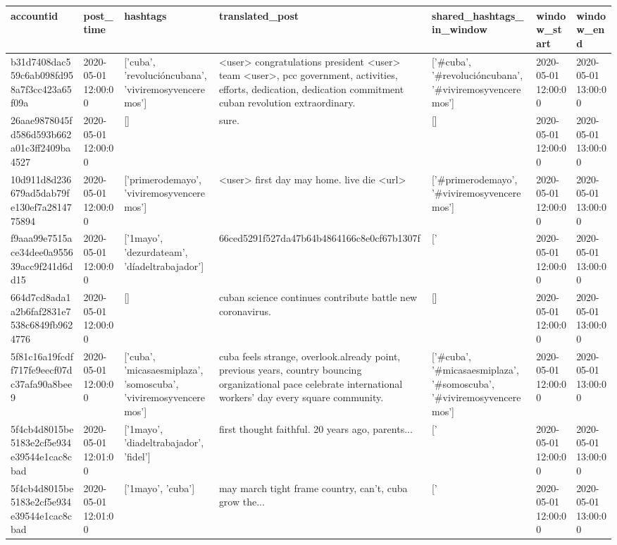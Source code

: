 \begin{tabular}{lllllll}
\toprule
accountid & post\_time & hashtags & translated\_post & shared\_hashtags\_in\_window & window\_start & window\_end \\
\midrule
b31d7408dac559c6ab098fd958a7f3cc423a65f09a & 2020-05-01 12:00:00 & ['cuba', 'revolucióncubana', 'viviremosyvenceremos'] & <user> congratulations president <user> team <user>, pcc government, activities, efforts, dedication, dedication commitment cuban revolution extraordinary. & ['#cuba', '#revolucióncubana', '#viviremosyvenceremos'] & 2020-05-01 12:00:00 & 2020-05-01 13:00:00 \\
26aae9878045fd586d593b662a01c3ff2409ba4527 & 2020-05-01 12:00:00 & [] & sure. & [] & 2020-05-01 12:00:00 & 2020-05-01 13:00:00 \\
10d911d8d236679ad5dab79fe130ef7a2814775894 & 2020-05-01 12:00:00 & ['primerodemayo', 'viviremosyvenceremos'] & <user> first day may home. live die <url> & ['#primerodemayo', '#viviremosyvenceremos'] & 2020-05-01 12:00:00 & 2020-05-01 13:00:00 \\
f9aaa99e7515ace34dee0a955639acc9f241d6dd15 & 2020-05-01 12:00:00 & ['1mayo', 'dezurdateam', 'díadeltrabajador'] & 66ced5291f527da47b64b4864166c8e0cf67b1307f & ['#1mayo', '#dezurdateam', '#díadeltrabajador'] & 2020-05-01 12:00:00 & 2020-05-01 13:00:00 \\
664d7cd8ada1a2b6faf2831e7538c6849fb9624776 & 2020-05-01 12:00:00 & [] & cuban science continues contribute battle new coronavirus. & [] & 2020-05-01 12:00:00 & 2020-05-01 13:00:00 \\
5f81c16a19fcdff717fe9eecf07dc37afa90a8bee9 & 2020-05-01 12:00:00 & ['cuba', 'micasaesmiplaza', 'somoscuba', 'viviremosyvenceremos'] & cuba feels strange, overlook.already point, previous years, country bouncing organizational pace celebrate international workers' day every square community. & ['#cuba', '#micasaesmiplaza', '#somoscuba', '#viviremosyvenceremos'] & 2020-05-01 12:00:00 & 2020-05-01 13:00:00 \\
5f4cb4d8015be5183e2cf5e934e39544e1cac8cbad & 2020-05-01 12:01:00 & ['1mayo', 'diadeltrabajador', 'fidel'] & first thought faithful. 2️0️ years ago, parents... & ['#1mayo', '#diadeltrabajador', '#fidel'] & 2020-05-01 12:00:00 & 2020-05-01 13:00:00 \\
5f4cb4d8015be5183e2cf5e934e39544e1cac8cbad & 2020-05-01 12:01:00 & ['1mayo', 'cuba'] & may march tight frame country, can't, cuba grow the... & ['#1mayo', '#cuba'] & 2020-05-01 12:00:00 & 2020-05-01 13:00:00 \\

\end{tabular}
